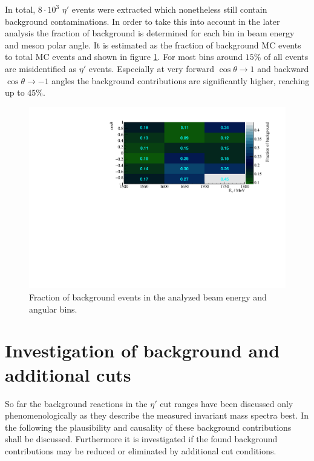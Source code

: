 In total, $8\cdot10^3$ $\eta'$ events were extracted which nonetheless still contain background contaminations. In order to take this into account in the later analysis the fraction of background is determined for each bin in beam energy and meson polar angle. It is estimated as the fraction of background MC events to total MC events and shown in figure \ref{fig:bkg}. For most bins around $15\%$ of all events are misidentified as $\eta'$ events. Especially at very forward $\cos\theta\to1$ and backward $\cos\theta\to-1$ angles the background contributions are significantly higher, reaching up to $45\%$.
\begin{figure}[htbp]
	\centering
	\includegraphics[width=\linewidth]{../figs/hydrogen/bin_cuts/invcut_bkg_percentage.pdf}
	\caption{Fraction of background events in the analyzed beam energy and angular bins.}
	\label{fig:bkg}
\end{figure}

\section{Investigation of background and additional cuts} 
\label{sec:bkg}
So far the background reactions in the $\eta'$ cut ranges have been discussed only phenomenologically as they describe the measured invariant mass spectra best. In the following the plausibility and causality of these background contributions shall be discussed. Furthermore it is investigated if the found background contributions may be reduced or eliminated by additional cut conditions.

